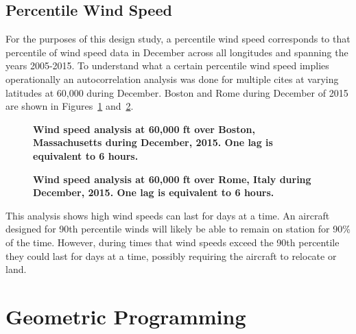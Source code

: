 \documentclass[]{aiaa-tc}%
\begin{document}
\subsection{Percentile Wind Speed}

For the purposes of this design study, a percentile wind speed corresponds to that percentile of wind speed data in December across all longitudes and spanning the years 2005-2015.  
To understand what a certain percentile wind speed implies operationally an autocorrelation analysis was done for multiple cites at varying latitudes at 60,000 during December. 
Boston and Rome during December of 2015 are shown in Figures~\ref{f:bostonwinds} and~\ref{f:romewinds}. 

\begin{figure}[H]
 \begin{subfigmatrix}{2}%
 \end{subfigmatrix}
 \caption{\textbf{Wind speed analysis at 60,000 ft over Boston, Massachusetts during December, 2015. One lag is equivalent to 6 hours. }}
 \label{f:bostonwinds}
\end{figure}

\begin{figure}[H]
 \begin{subfigmatrix}{2}%
 \end{subfigmatrix}
 \caption{\textbf{Wind speed analysis at 60,000 ft over Rome, Italy during December, 2015. One lag is equivalent to 6 hours. }}
 \label{f:romewinds}
\end{figure}

This analysis shows high wind speeds can last for days at a time.  
An aircraft designed for 90th percentile winds will likely be able to remain on station for 90\% of the time.  
However, during times that wind speeds exceed the 90th percentile they could last for days at a time, possibly requiring the aircraft to relocate or land. 

\section{Geometric Programming\cite{gp}}
\end{document}
